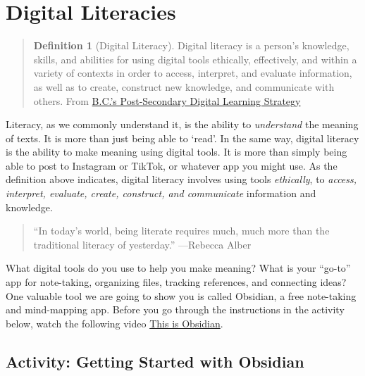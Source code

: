 \documentclass[
]{book}
\theoremstyle{definition}
\newtheorem{definition}{Definition}[chapter]
\theoremstyle{definition}
\theoremstyle{definition}
\theoremstyle{definition}
\theoremstyle{remark}
\begin{document}
\hypertarget{digital-literacies}{%
\section{Digital Literacies}\label{digital-literacies}}

\begin{quote}
\begin{definition}[Digital Literacy]
\protect\hypertarget{def:diglit}{}\label{def:diglit}Digital literacy is a person's knowledge, skills, and abilities for using digital tools ethically, effectively, and within a variety of contexts in order to access, interpret, and evaluate information, as well as to create, construct new knowledge, and communicate with others. From \href{https://www2.gov.bc.ca/assets/gov/education/post-secondary-education/institution-resources-administration/digital-learning-strategy/digital_learning_strategy.pdf}{B.C.'s Post-Secondary Digital Learning Strategy}
\end{definition}
\end{quote}

Literacy, as we commonly understand it, is the ability to \emph{understand} the meaning of texts. It is more than just being able to `read'. In the same way, digital literacy is the ability to make meaning using digital tools. It is more than simply being able to post to Instagram or TikTok, or whatever app you might use. As the definition above indicates, digital literacy involves using tools \emph{ethically}, to \emph{access, interpret, evaluate, create, construct, and communicate} information and knowledge.

\begin{quote}
``In today's world, being literate requires much, much more than the traditional literacy of yesterday.''
---Rebecca Alber
\end{quote}

What digital tools do you use to help you make meaning? What is your ``go-to'' app for note-taking, organizing files, tracking references, and connecting ideas? One valuable tool we are going to show you is called Obsidian, a free note-taking and mind-mapping app. Before you go through the instructions in the activity below, watch the following video \href{https://www.youtube.com/watch?v=d2FNqEDGc8g}{This is Obsidian}.

\hypertarget{activity-getting-started-with-obsidian}{%
\subsection*{Activity: Getting Started with Obsidian}\label{activity-getting-started-with-obsidian}}
\end{document}
